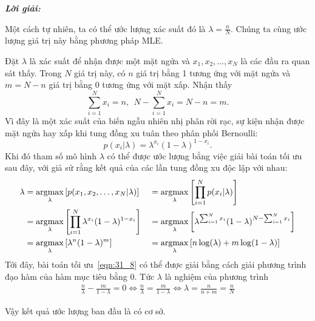 \textit{\textbf{Lời giải:}}

Một cách tự nhiên, ta có thể ước lượng xác suất đó là $\lambda
= \frac{n}{N}$. Chúng ta cùng ước lượng giá trị này bằng phương pháp MLE.

Đặt $\lambda$ là xác suất để nhận được một mặt ngửa và $x_1, x_2,
\dots, x_N$ là các đầu ra quan sát thấy. Trong $N$ giá trị này, có $n$ giá trị bằng 1 tương ứng
với mặt ngửa và $m = N - n$ giá trị bằng 0 tương ứng với mặt
xấp. Nhận thấy
\begin{equation}
\sum_{i=1}^N x_i = n, ~~N - \sum_{i=1}^N x_i = N - n = m.
\end{equation}
Vì đây là một xác suất của biến ngẫu nhiên nhị phân rời rạc, sự kiện nhận được mặt ngửa hay xấp khi tung đồng xu tuân theo
phân phối Bernoulli:
\begin{equation}
p(x_i | \lambda) = \lambda^{x_i} ( 1- \lambda)^{1 - x_i}.
\end{equation}
Khi đó tham số mô hình $\lambda$ có thể được ước lượng bằng việc giải bài toán
tối ưu sau đây, với giả sử rằng kết quả của các lần tung đồng xu độc lập với
nhau:
\begin{alignat}{3}
\lambda & =  \operatorname*{argmax}_{\lambda}\left[ p(x_1, x_2, \dots, x_N | \lambda)\right]
&& =  \operatorname*{argmax}_{\lambda} \left[\prod_{i = 1}^N p(x_i | \lambda)\right] \\
\label{eqn:31_6}
& =  \operatorname*{argmax}_{\lambda} \left[\prod_{i=1}^N  \lambda^{x_i} ( 1- \lambda)^{1 - x_i}\right]
&& = \operatorname*{argmax}_{\lambda} \left[\lambda^{\sum_{i=1}^N x_i} (1 - \lambda)^{N - \sum_{i=1}^N x_i}\right]  \\\
\label{eqn:31_8}
& = \operatorname*{argmax}_{\lambda} \left[\lambda^{n} (1 - \lambda)^{m}\right]
&& = \operatorname*{argmax}_{\lambda} \left[ n\log(\lambda) + m\log(1 - \lambda) \right]
\end{alignat}
Tới đây, bài toán tối ưu~\eqref{eqn:31_8} có thể được giải bằng cách giải phương
trình đạo hàm của hàm mục tiêu bằng 0. Tức $\lambda$ là nghiệm của phương trình
\begin{eqnarray}
\frac{n}{\lambda} - \frac{m}{1 - \lambda}  =  0
\Leftrightarrow \frac{n}{\lambda}  =  \frac{m}{1 - \lambda}
\Leftrightarrow \lambda  =  \frac{n}{n + m} = \frac{n}{N}
\end{eqnarray}

Vậy kết quả ước lượng ban đầu là có cơ sở.


